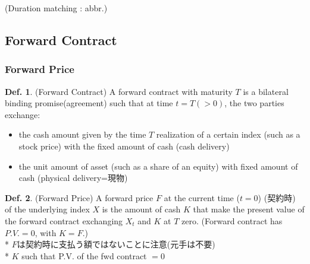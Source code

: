 \documentclass[a4paper,11pt]{jsarticle}
\theoremstyle{definition}
\newtheorem{definition}{Def.}[subsection]
\begin{document}
(Duration matching : abbr.)



\subsection{Forward Contract}
\subsubsection{Forward Price}

\begin{definition}{(Forward Contract)}
  A forward contract with maturity $T$ is a bilateral binding
  promise(agreement) such that at time $t=T(>0)$,
  the two parties exchange:
  \begin{itemize}
    \item the cash amount given by the time $T$ realization of
    a certain index (such as a stock price) with the fixed amount of
    cash (cash delivery)
    \item the unit amount of asset (such as a share of an equity)
    with fixed amount of cash (physical delivery=現物)
  \end{itemize}
\end{definition}

\begin{definition}{(Forward Price)}
  A forward price $F$ at the current time ($t=0$) (契約時) of
  the underlying index $X$ is the amount of cash $K$ that make
  the present value of the forward contract exchanging $X_t$
  and $K$ at $T$ zero. 
  (Forward contract has $P.V.=0$, with $K=F$.)\\
  * $F$は契約時に支払う額ではないことに注意(元手は不要) \\
  * $K$ such that P.V. of the fwd contract $=0$
\end{definition}
\end{document}
